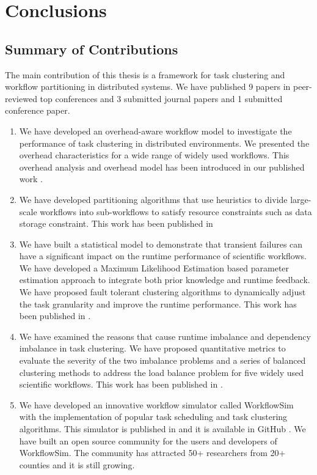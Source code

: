 \chapter{Conclusions}

\section{Summary of Contributions}


The main contribution of this thesis is a framework for task clustering and workflow partitioning in distributed systems. We have published 9 papers in peer-reviewed top conferences and 3 submitted journal papers and 1 submitted conference paper. 
\begin{enumerate}
\item We have developed an overhead-aware workflow model to investigate the performance of task clustering in distributed environments. We presented the overhead characteristics for a wide range of widely used workflows. This overhead analysis and overhead model has been introduced in our published work \cite{Chen2013a, Chen2011, Chen2013b}. 
\item We have developed partitioning algorithms that use heuristics to divide large-scale workflows into sub-workflows to satisfy resource constraints such as data storage constraint. This work has been published in \cite{Chen2011a, Integration2012}
\item We have built a statistical model to demonstrate that transient failures can have a significant impact on the runtime performance of scientific workflows. We have developed a Maximum Likelihood Estimation based parameter estimation approach to integrate both prior knowledge and runtime feedback. We have proposed fault tolerant clustering algorithms to dynamically adjust the task granularity and improve the runtime performance. This work has been published in \cite{Chen2012}. 
\item We have examined the reasons that cause runtime imbalance and dependency imbalance in task clustering. We have proposed quantitative metrics to evaluate the severity of the two imbalance problems and a series of balanced clustering methods to address the load balance problem for five widely used scientific workflows. This work has been published in \cite{Chen2013a, Chen2013b}. 
\item We have developed an innovative workflow simulator called WorkflowSim with the implementation of popular task scheduling and task clustering algorithms. This simulator is published in \cite{WorkflowSim} and it is available in GitHub \cite{WorkflowSim-Github}. 
We have built an open source community for the users and developers of WorkflowSim. The community has attracted 50+ researchers from 20+ counties and it is still growing. 
\end{enumerate}



